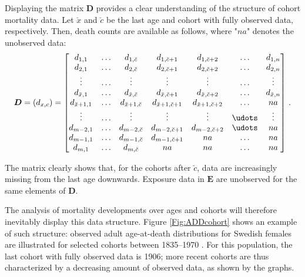 \documentclass[11pt, a4paper]{article}
\newcommand{\tikzmark}[1]{\tikz[overlay,remember picture,baseline=(#1.base)]
	\node (#1) {\strut};}
\begin{document}
{Displaying the matrix $\bm{D}$ provides a clear understanding of the structure of cohort mortality data.  Let $\breve{x}$ and $\breve{c}$ be the last age and cohort with fully observed data, respectively. Then, death counts are available as follows, where "$na$" denotes the unobserved data:
%
\begin{equation}\label{Eq:Dmat}
\bm{D} = (d_{{x,c}}) = \begin{bmatrix} 
d_{1,1} & \dots & d_{1,\breve{c}} & d_{1,\breve{c}+1} & d_{1,\breve{c}+2} & \dots &  d_{1,n} \\
d_{2,1} & \dots & d_{2,\breve{c}} & d_{2,\breve{c}+1} & d_{2,\breve{c}+2} & \dots &  d_{2,n} \\
\vdots & \dots & \vdots & \vdots & \vdots & \dots &   \vdots \\
d_{\breve{x},1} & \dots & d_{\breve{x},\breve{c}} & d_{\breve{x},\breve{c}+1} & d_{\breve{x},\breve{c}+2} & \dots &  d_{\breve{x},n} \\
d_{\breve{x}+1,1} & \dots & d_{\breve{x}+1,\breve{c}} & d_{\breve{x}+1,\breve{c}+1} & d_{\breve{x}+1,\breve{c}+2} & \dots &  na \\
\vdots & \dots & \vdots & \vdots & \vdots & \udots &   \vdots \\
d_{m-2,1} & \dots & d_{m-2,\breve{c}} & d_{m-2,\breve{c}+1} & d_{m-2,\breve{c}+2} & \udots  & na \\
d_{m-1,1} & \dots & d_{m-1,\breve{c}} & d_{m-1,\breve{c}+1} &  na  & \dots & na \\
\tikzmark{lower1}d_{m,1} & \dots & d_{m,\breve{c}}\tikzmark{lower2} & \tikzmark{lowerA}na  & na  & \dots & na\tikzmark{lowerB}
\end{bmatrix} \, . \notag
\end{equation}
%


\medskip The matrix clearly shows that, for the cohorts after $\breve{c}$, data are increasingly missing from the last age downwards. Exposure data in $\bm{E}$ are unobserved for the same elements of $\bm{D}$.  

The analysis of mortality developments over ages and cohorts will therefore inevitably display this data structure. Figure \ref{Fig:ADDcohort} shows an example of such structure: observed adult age-at-death distributions for Swedish females are illustrated for selected cohorts between 1835--1970 \cite[data retrieved from the][]{HMD}. For this population, the last cohort with fully observed data is 1906; more recent cohorts are thus characterized by a decreasing amount of observed data, as shown by the graphs.

}
\end{document}

